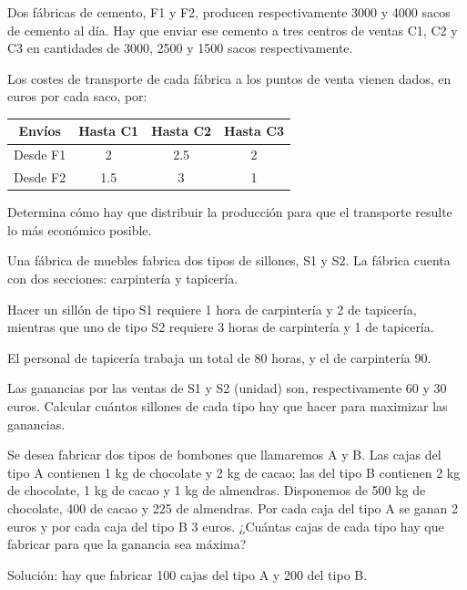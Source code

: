 \begin{Ejer}
Dos f\'abricas de cemento, F1 y F2, producen respectivamente 3000 y 4000 sacos de cemento al d\'ia. Hay que enviar ese cemento a tres centros de ventas C1, C2 y C3 en cantidades de 3000, 2500 y 1500 sacos respectivamente.

Los costes de transporte de cada f\'abrica a los puntos de venta vienen dados, en euros por cada saco, por:

\begin{center}
\begin{tabular}{c|ccc}
Env\'ios & Hasta C1 & Hasta C2 & Hasta C3 \\
\hline
Desde F1 & 2 & 2.5 & 2 \\
Desde F2 & 1.5 & 3 & 1 \\
\end{tabular}
\end{center}

Determina c\'omo hay que distribuir la producci\'on para que el transporte resulte lo m\'as econ\'omico posible.
\end{Ejer}


\begin{Ejer}
Una f\'abrica de muebles fabrica dos tipos de sillones, S1 y S2. La f\'abrica cuenta con dos secciones: carpinter\'ia y tapicer\'ia.

Hacer un sill\'on de tipo S1 requiere 1 hora de carpinter\'ia y 2 de tapicer\'ia, mientras que uno de tipo S2 requiere 3 horas de carpinter\'ia y 1 de tapicer\'ia.

El personal de tapicer\'ia trabaja un total de 80 horas, y el de carpinter\'ia 90.

Las ganancias por las ventas de S1 y S2 (unidad) son, respectivamente 60 y 30 euros. Calcular cu\'antos sillones de cada tipo hay que hacer para maximizar las ganancias.
\end{Ejer}

\begin{Ejer}
Se desea fabricar dos tipos de bombones que llamaremos A y B. Las cajas del tipo A contienen 1 kg de chocolate y 2 kg de cacao; las del tipo B contienen 2 kg de chocolate, 1 kg de cacao y 1 kg de almendras. Disponemos de 500 kg de chocolate, 400 de cacao y 225 de almendras. Por cada caja del tipo A se ganan 2 euros y por cada caja del tipo B 3 euros. ¿Cu\'antas cajas de cada tipo hay que fabricar para que la ganancia sea m\'axima?

Soluci\'on: hay que fabricar 100 cajas del tipo A y 200 del tipo B.
\end{Ejer}


